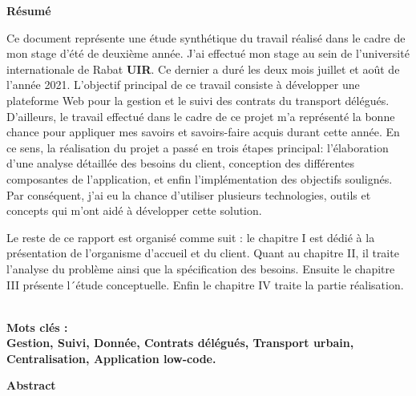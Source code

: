 \documentclass[a4paper]{report}
\begin{document}
\clearpage
{}
\begin{doublespace}
    \begin{center}
        \vspace*{1cm}

        \textbf{\huge{Résumé}}

    \end{center}
\end{doublespace}
\begin{doublespace}
    Ce document représente une étude synthétique du travail réalisé dans le
    cadre de mon stage d'été de deuxième année. J'ai effectué mon stage au sein de
    l'université internationale de Rabat \textbf{UIR}. Ce dernier a duré les deux
    mois juillet et août de l'année 2021. L’objectif principal de ce travail
    consiste à développer une plateforme Web pour la gestion et le suivi des
    contrats du transport délégués. D'ailleurs, le travail effectué dans le cadre
    de ce projet m'a représenté la bonne chance pour appliquer mes savoirs et
    savoirs-faire acquis durant cette année. En ce sens, la réalisation du projet a
    passé en trois étapes principal: l'élaboration d'une analyse détaillée des
    besoins du client, conception des différentes composantes de l'application, et
    enfin l'implémentation des objectifs soulignés. Par conséquent, j'ai eu la
    chance d'utiliser plusieurs technologies, outils et concepts qui m'ont aidé à
    développer cette solution.
\end{doublespace}
\begin{doublespace}

    Le reste de ce rapport est organisé comme suit : le chapitre I est dédié à
    la présentation de
    l’organisme d’accueil et du client. Quant au chapitre II, il traite
    l’analyse du problème ainsi que la spécification des besoins. Ensuite le
    chapitre III présente l´étude conceptuelle. Enfin le chapitre IV traite la
    partie réalisation.

    \textbf	{\\Mots clés :\\ Gestion, Suivi, Donnée, Contrats délégués,
        Transport urbain, Centralisation, Application low-code.}

\end{doublespace}
\clearpage
{}
\begin{doublespace}
    \begin{center}
        \vspace*{1cm}
        \textbf{\huge{Abstract}}
    \end{center}
\end{doublespace}
\end{document}
